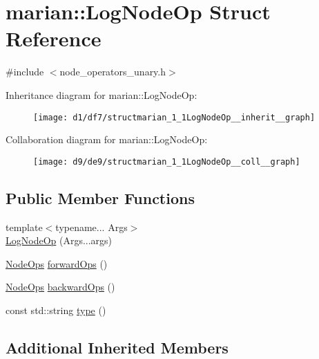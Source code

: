 \hypertarget{structmarian_1_1LogNodeOp}{}\section{marian\+:\+:Log\+Node\+Op Struct Reference}
\label{structmarian_1_1LogNodeOp}


{\ttfamily \#include $<$node\+\_\+operators\+\_\+unary.\+h$>$}



Inheritance diagram for marian\+:\+:Log\+Node\+Op\+:
\nopagebreak
\begin{figure}[H]
\begin{center}
\leavevmode
\texttt{[image: d1/df7/structmarian\_1\_1LogNodeOp\_\_inherit\_\_graph]}
\end{center}
\end{figure}


Collaboration diagram for marian\+:\+:Log\+Node\+Op\+:
\nopagebreak
\begin{figure}[H]
\begin{center}
\leavevmode
\texttt{[image: d9/de9/structmarian\_1\_1LogNodeOp\_\_coll\_\_graph]}
\end{center}
\end{figure}
\subsection*{Public Member Functions}
\begin{DoxyCompactItemize}
\item 
{\footnotesize template$<$typename... Args$>$ }\\\hyperlink{structmarian_1_1LogNodeOp_adf90f3beccf4c501a8574f710d3a1dcd}{Log\+Node\+Op} (Args...\+args)
\item 
\hyperlink{namespacemarian_a4956376218cc236016c20bc4071470da}{Node\+Ops} \hyperlink{structmarian_1_1LogNodeOp_a0ad5ecdd99694a41ddd443700f03b52b}{forward\+Ops} ()
\item 
\hyperlink{namespacemarian_a4956376218cc236016c20bc4071470da}{Node\+Ops} \hyperlink{structmarian_1_1LogNodeOp_a739a39b083f5995aee9badd4b528de03}{backward\+Ops} ()
\item 
const std\+::string \hyperlink{structmarian_1_1LogNodeOp_adc780bb152e730c3e4414e37f6814442}{type} ()
\end{DoxyCompactItemize}
\subsection*{Additional Inherited Members}


